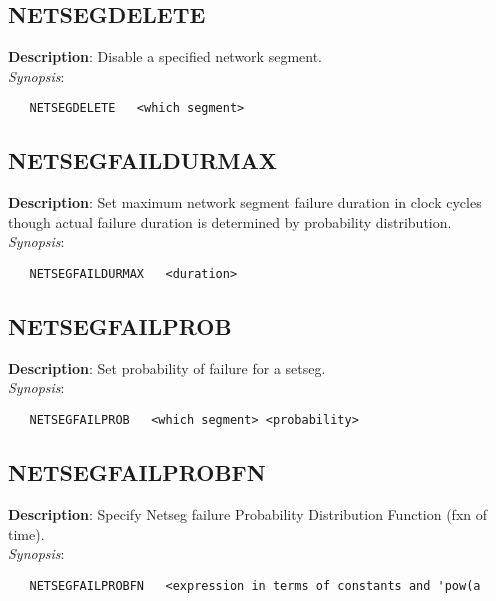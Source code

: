 \subsection{\bf NETSEGDELETE}
\label{manpages:NETSEGDELETE}
\label{manpages:netsegdelete}
\vspace{-0.2in}
{\bf Description}: 	Disable a specified network segment.\\[1.5ex]
{\em Synopsis}:
\vspace{-0.2in}
\scriptsize
\begin{verbatim}
   NETSEGDELETE   <which segment>			
\end{verbatim}
\normalsize
\vspace{-0.2in}


\subsection{\bf NETSEGFAILDURMAX}
\label{manpages:NETSEGFAILDURMAX}
\label{manpages:netsegfaildurmax}
\vspace{-0.2in}
{\bf Description}: 	Set maximum network segment failure duration in clock cycles though actual failure duration is determined by probability distribution.\\[1.5ex]
{\em Synopsis}:
\vspace{-0.2in}
\scriptsize
\begin{verbatim}
   NETSEGFAILDURMAX   <duration>		
\end{verbatim}
\normalsize
\vspace{-0.2in}


\subsection{\bf NETSEGFAILPROB}
\label{manpages:NETSEGFAILPROB}
\label{manpages:netsegfailprob}
\vspace{-0.2in}
{\bf Description}: 	Set probability of failure for a setseg.\\[1.5ex]
{\em Synopsis}:
\vspace{-0.2in}
\scriptsize
\begin{verbatim}
   NETSEGFAILPROB   <which segment> <probability>	
\end{verbatim}
\normalsize
\vspace{-0.2in}


\subsection{\bf NETSEGFAILPROBFN}
\label{manpages:NETSEGFAILPROBFN}
\label{manpages:netsegfailprobfn}
\vspace{-0.2in}
{\bf Description}: 	Specify Netseg failure Probability Distribution Function (fxn of time).\\[1.5ex]
{\em Synopsis}:
\vspace{-0.2in}
\scriptsize
\begin{verbatim}
   NETSEGFAILPROBFN   <expression in terms of constants and 'pow(a
\end{verbatim}
\normalsize
\vspace{-0.2in}


